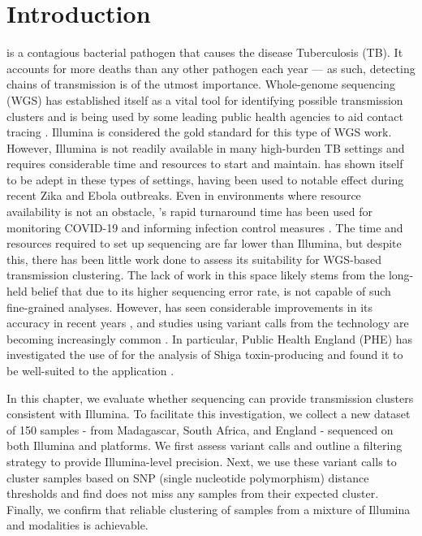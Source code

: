 \section{Introduction}
\mtb{} is a contagious bacterial pathogen that causes the disease Tuberculosis (TB). It accounts for more deaths than any other pathogen each year \cite{who2020} — as such, detecting chains of \mtb{} transmission is of the utmost importance. Whole-genome sequencing (WGS) has established itself as a vital tool for identifying possible transmission clusters and is being used by some leading public health agencies to aid contact tracing \cite{phe-tb-england,brooks2020}. Illumina is considered the gold standard for this type of WGS work. However, Illumina is not readily available in many high-burden TB settings and requires considerable time and resources to start and maintain. \ont{} has shown itself to be adept in these types of settings, having been used to notable effect during recent Zika \cite{faria2016} and Ebola \cite{quick2016,Hoenen2016} outbreaks. Even in environments where resource availability is not an obstacle, \ont{}'s rapid turnaround time has been used for monitoring COVID-19 and informing infection control measures \cite{meredith2020}. The time and resources required to set up \ont{} sequencing are far lower than Illumina, but despite this, there has been little work done to assess its suitability for \mtb{} WGS-based transmission clustering. The lack of work in this space likely stems from the long-held belief that due to its higher sequencing error rate, \ont{} is not capable of such fine-grained analyses. However, \ont{} has seen considerable improvements in its accuracy in recent years \cite{wick2019}, and studies using variant calls from the technology are becoming increasingly common \cite{sanderson2020,watson2020}. In particular, Public Health England (PHE) has investigated the use of \ont{} for the analysis of Shiga toxin-producing \ecoli{} and found it to be well-suited to the application \cite{greig2021}. 

In this chapter, we evaluate whether \ont{} sequencing can provide \mtb{} transmission clusters consistent with Illumina. To facilitate this investigation, we collect a new dataset of 150 samples - from Madagascar, South Africa, and England - sequenced on both Illumina and \ont{} platforms. We first assess \ont{} variant calls and outline a filtering strategy to provide Illumina-level precision. Next, we use these variant calls to cluster samples based on SNP (single nucleotide polymorphism) distance thresholds and find \ont{} does not miss any samples from their expected cluster. Finally, we confirm that reliable clustering of samples from a mixture of Illumina and \ont{} modalities is achievable.

